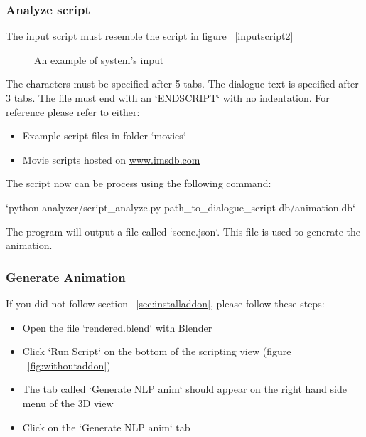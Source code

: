 \subsubsection{Analyze script \label{sec:analyze-script}}
\noindent The input script must resemble the script in figure ~\ref{inputscript2}

\begin{figure}[!ht]
	\centerline{}
	\caption{An example of system's input}\label{fig:inputscript2}
\end{figure}

\noindent The characters must be specified after 5 tabs. The dialogue text is specified after 3 tabs. The file must end with an `ENDSCRIPT` with no indentation. For reference please refer to either:
\begin{itemize}
	\item Example script files in folder `movies`
	\item Movie scripts hosted on \url{www.imsdb.com}
\end{itemize}

\noindent The script now can be process using the following command:

\indent `python analyzer/script\_analyze.py path\_to\_dialogue\_script db/animation.db`

\noindent The program will output a file called `scene.json`. This file is used to generate the animation.

\subsubsection{Generate Animation}
\noindent If you did not follow section ~\ref{sec:installaddon}, please follow these steps:
\begin{itemize}
	\item Open the file `rendered.blend` with Blender
	\item Click `Run Script` on the bottom of the scripting view (figure ~\ref{fig:withoutaddon})
	\item The tab called `Generate NLP anim` should appear on the right hand side menu of the 3D view
	\item Click on the `Generate NLP anim` tab
\end{itemize}

